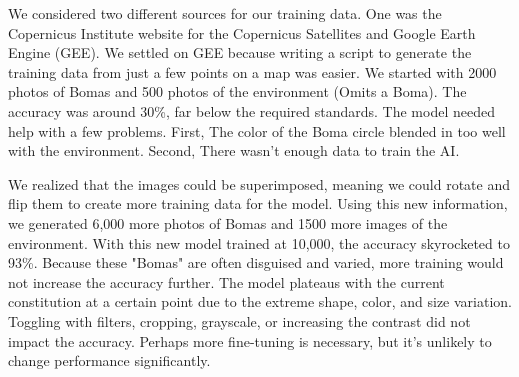 \documentclass{article}
\begin{document}
We considered two different sources for our training data. One was the Copernicus Institute website for the Copernicus Satellites and Google Earth Engine (GEE). We settled on GEE because writing a script to generate the training data from just a few points on a map was easier. We started with 2000 photos of Bomas and 500 photos of the environment (Omits a Boma). The accuracy was around 30\%, far below the required standards. The model needed help with a few problems. First, The color of the Boma circle blended in too well with the environment. Second, There wasn’t enough data to train the AI.

We realized that the images could be superimposed, meaning we could rotate and flip them to create more training data for the model. Using this new information, we generated 6,000 more photos of Bomas and 1500 more images of the environment. With this new model trained at 10,000, the accuracy skyrocketed to 93\%. Because these "Bomas" are often disguised and varied, more training would not increase the accuracy further. The model plateaus with the current constitution at a certain point due to the extreme shape, color, and size variation. Toggling with filters, cropping, grayscale, or increasing the contrast did not impact the accuracy. Perhaps more fine-tuning is necessary, but it's unlikely to change performance significantly.




\end{document}
